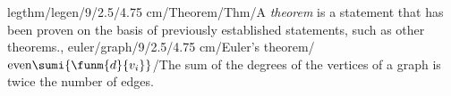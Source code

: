 legthm/legen/9/2.5/4.75 cm/Theorem/Thm/{A \emph{theorem} is a statement that has been proven on the basis of previously established statements, such as other theorems.},
euler/graph/9/2.5/4.75 cm/Euler's theorem/$\mbox{even}\sumi{\funm{d}{v_i}}$/{The sum of the degrees of the vertices of a graph is twice the number of edges.}
